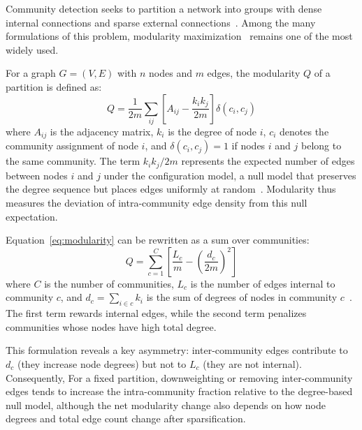 \documentclass[10pt,journal,compsoc]{IEEEtran}
\begin{document}

Community detection seeks to partition a network into groups with dense 
internal connections and sparse external connections~\cite{fortunato2010community}. 
Among the many formulations of this problem, modularity 
maximization~\cite{newman2004finding,newman2006modularity} remains one of 
the most widely used.

For a graph $G = (V, E)$ with $n$ nodes and $m$ edges, the modularity $Q$ 
of a partition is defined as:
\begin{equation}
Q = \frac{1}{2m} \sum_{ij} \left[ A_{ij} - \frac{k_i k_j}{2m} \right] 
    \delta(c_i, c_j)
\label{eq:modularity}
\end{equation}
where $A_{ij}$ is the adjacency matrix, $k_i$ is the degree of node $i$, 
$c_i$ denotes the community assignment of node $i$, and $\delta(c_i, c_j) = 1$ 
if nodes $i$ and $j$ belong to the same community. The term $k_i k_j / 2m$ represents the expected number of edges between 
nodes $i$ and $j$ under the configuration model, a null model that preserves 
the degree sequence but places edges uniformly at 
random~\cite{newman2003structure,molloy1995critical}. Modularity thus 
measures the deviation of intra-community edge density from this null 
expectation.

Equation~\eqref{eq:modularity} can be rewritten as a sum over communities:
\begin{equation}
Q = \sum_{c=1}^{C} \left[ \frac{L_c}{m} - \left( \frac{d_c}{2m} \right)^2 \right]
\label{eq:modularity-community}
\end{equation}
where $C$ is the number of communities, $L_c$ is the number of edges 
internal to community $c$, and $d_c = \sum_{i \in c} k_i$ is the sum of 
degrees of nodes in community $c$~\cite{newman2006modularity}. The first 
term rewards internal edges, while the second term penalizes communities whose 
nodes have high total degree.

This formulation reveals a key asymmetry: inter-community edges contribute 
to $d_c$ (they increase node degrees) but not to $L_c$ (they are not 
internal). Consequently, For a fixed partition, downweighting or removing inter-community edges tends to increase the intra-community fraction relative to the degree-based null model, although the net modularity change also depends on how node degrees and total edge count change after sparsification.
\end{document}
